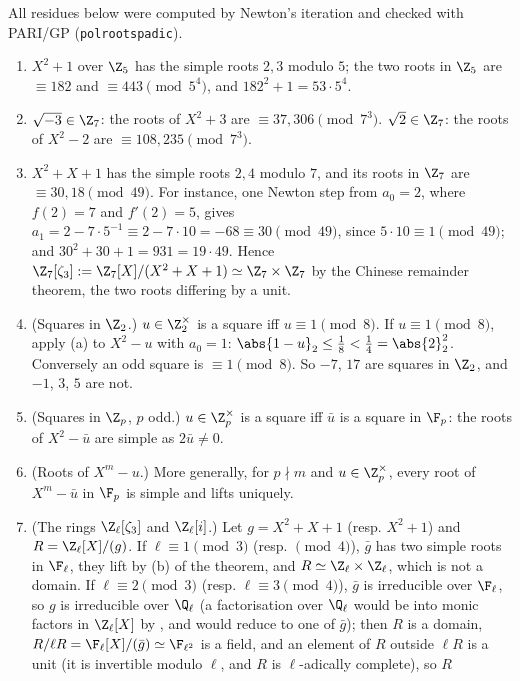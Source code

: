 \begin{example}\label{ex:local:hensel-examples}
All residues below were computed by Newton's iteration and checked with PARI/GP (\texttt{polrootspadic}).
\begin{enumerate}[label=(\alph*)]
\item $X^2+1$ over $\Z_5$ has the simple roots $2,3$ modulo $5$; the two roots in $\Z_5$ are $\equiv182$ and $\equiv443\pmod{5^4}$, and
$182^2+1=53\cdot5^4$.
\item $\sqrt{-3}\in\Z_7$: the roots of $X^2+3$ are $\equiv37,306\pmod{7^3}$. $\sqrt2\in\Z_7$: the roots of $X^2-2$ are $\equiv108,235\pmod{7^3}$.
\item $X^2+X+1$ has the simple roots $2,4$ modulo $7$, and its roots in $\Z_7$ are $\equiv30,18\pmod{49}$. For instance, one Newton step from $a_0=2$,
where $f(2)=7$ and $f'(2)=5$, gives $a_1=2-7\cdot5^{-1}\equiv2-7\cdot10=-68\equiv30\pmod{49}$, since $5\cdot10\equiv1\pmod{49}$; and
$30^2+30+1=931=19\cdot49$. Hence
$\Z_7[\zeta_3]:=\Z_7[X]/(X^2+X+1)\simeq\Z_7\times\Z_7$ by the Chinese remainder theorem, the two roots differing by a unit.
\item (Squares in $\Z_2$.) $u\in\Z_2^\times$ is a square iff $u\equiv1\pmod8$. If $u\equiv1\pmod8$, apply (a) to $X^2-u$ with
$a_0=1$: $\abs{1-u}_2\le\frac18<\frac14=\abs{2}_2^2$. Conversely an odd square is $\equiv1\pmod8$. So $-7$, $17$ are squares in $\Z_2$, and $-1$, $3$, $5$ are
not.
\item (Squares in $\Z_p$, $p$ odd.) $u\in\Z_p^\times$ is a square iff $\bar u$ is a square in $\F_p$: the roots of $X^2-\bar u$ are simple as $2\bar u\ne0$.
\item (Roots of $X^m-u$.) More generally, for $p\nmid m$ and $u\in\Z_p^\times$, every root of $X^m-\bar u$ in $\F_p$ is simple and lifts uniquely.
\item (The rings $\Z_\ell[\zeta_3]$ and $\Z_\ell[i]$.) Let $g=X^2+X+1$ (resp. $X^2+1$) and $R=\Z_\ell[X]/(g)$. If $\ell\equiv1\pmod3$ (resp. $\pmod4$), $\bar g$
has two simple roots in $\F_\ell$, they lift by (b) of the theorem, and $R\simeq\Z_\ell\times\Z_\ell$, which is not a domain. If $\ell\equiv2\pmod3$
(resp. $\ell\equiv3\pmod4$), $\bar g$ is irreducible over $\F_\ell$, so $g$ is irreducible over $\Q_\ell$ (a factorisation over $\Q_\ell$ would be into
monic factors in $\Z_\ell[X]$ by , and would reduce to one of $\bar g$); then $R$ is a domain, $R/\ell R=\F_\ell[X]/(\bar g)
\simeq\F_{\ell^2}$ is a field, and an element of $R$ outside $\ell R$ is a unit (it is invertible modulo $\ell$, and $R$ is $\ell$-adically complete), so $R$

\end{enumerate}
\end{example}
